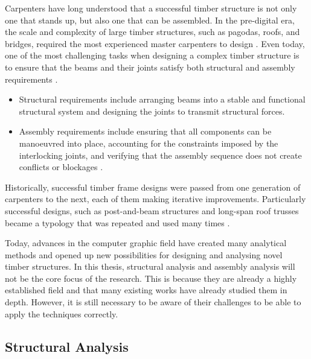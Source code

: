 Carpenters have long understood that a successful timber structure is not only one that stands up, but also one that can be assembled. In the pre-digital era, the scale and complexity of large timber structures, such as pagodas, roofs, and bridges, required the most experienced master carpenters to design \parencite{haymanTimberframedBuildings2021, hewettEnglishHistoricCarpentry2022, mullerHistoryDevelopmentStages2022, vandenabeeleJoiningTechniquesNineteenth2018}. Even today, one of the most challenging tasks when designing a complex timber structure is to ensure that the beams and their joints satisfy both structural and assembly requirements \parencite{chiltonTimberGridshellsArchitecture2016}.

\begin{itemize}
	\item Structural requirements include arranging beams into a stable and functional structural system and designing the joints to transmit structural forces. 

	\item Assembly requirements include ensuring that all components can be manoeuvred into place, accounting for the constraints imposed by the interlocking joints, and verifying that the assembly sequence does not create conflicts or blockages \parencite{wangStateArtComputational2021}. 

\end{itemize}
Historically, successful timber frame designs were passed from one generation of carpenters to the next, each of them making iterative improvements. Particularly successful designs, such as post-and-beam structures and long-span roof trusses became a typology that was repeated and used many times \parencite{sobonTimberFrameConstruction1984, jacksobonHistoricAmericanTimber2014}.

Today, advances in the computer graphic field have created many analytical methods and opened up new possibilities for designing and analysing novel timber structures. In this thesis, structural analysis and assembly analysis will not be the core focus of the research. This is because they are already a highly established field and that many existing works have already studied them in depth. However, it is still necessary to be aware of their challenges to be able to apply the techniques correctly.

\subsection{Structural Analysis}
\label{subsection:challenges_structural_analysis}

